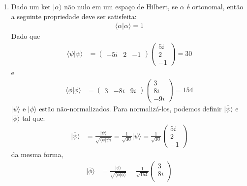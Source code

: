 \begin{prob}
	 \begin{sol}
		 \begin{enumerate}[label=\alph *)]
			 \item Dado um ket $|{\alpha}\rangle$ não nulo em um espaço de Hilbert, se $\alpha$ é ortonomal, então a seguinte propriedade deve ser satisfeita:
				 \begin{align}
					 \langle \alpha|\alpha \rangle = 1
				 \end{align}
				 Dado que
				 \begin{align}
					 \langle \psi|\psi\rangle &= 
					 \begin{pmatrix}
						 -5i & 2 & -1
					 \end{pmatrix}
					 \begin{pmatrix}
						 5i \\
						 2 \\
						 -1
					 \end{pmatrix} = 30
				 \end{align}
				 e
				 \begin{align}
					 \langle{\phi}|{\phi}\rangle &=
					 \begin{pmatrix}
						 3 & -8i & 9i
					 \end{pmatrix}
					 \begin{pmatrix}
						 3 \\
						 8i \\
						 -9i
					 \end{pmatrix} = 154
				 \end{align}
				 $|{\psi}\rangle$ e $|{\phi}\rangle$ estão $\boxed{\text{não-normalizados}}$. Para normalizá-los, podemos definir $|{\bar{\psi}}\rangle$ e $|{\bar{\phi}}\rangle$ tal que:
				 \begin{align}
					 |{\bar{\psi}}\rangle &= \frac{|{\psi}\rangle}{\sqrt{\langle{\psi}|{\psi}\rangle}}=\frac{1}{\sqrt{30}}|{\psi}\rangle
					 =\boxed{
						 \frac{1}{\sqrt{30}}
						 \begin{pmatrix}
							 5i \\
							 2 \\
							 -1
						 \end{pmatrix}
					 }
				 \end{align}
				 da mesma forma, 
				 \begin{align}
					 |{\bar{\phi}}\rangle &= \frac{|{\phi}\rangle}{\sqrt{\langle{\phi}|{\phi}\rangle}}=\boxed{
						 \frac{1}{\sqrt{154}}
						 \begin{pmatrix}
							 3 \\
							 8i \\

\end{pmatrix}}
\end{align}
\end{enumerate}
\end{sol}
\end{prob}
